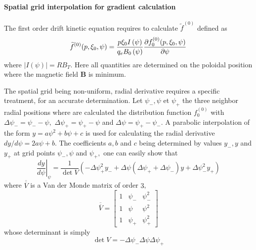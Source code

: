 
\label{dkegridinterp}\paragraph{Spatial grid interpolation for
gradient calculation}

The first order drift kinetic equation requires to calculate $\widetilde{f}%
^{(0)}$ defined as
\begin{equation}
\widetilde{f}^{(0)}(p,\xi _{0},\psi )=\frac{p\xi _{0}I\left( \psi \right) }{%
q_{e}B_{0}\left( \psi \right) }\frac{\partial f_{0}^{(0)}(p,\xi _{0},\psi )}{%
\partial \psi }
\end{equation}
where $\left| I\left( \psi \right) \right| =RB_{T}.$ Here all quantities are
determined on the poloidal position where the magnetic field  $\mathbf{B}$
is minimum.

The spatial grid being non-uniform, radial derivative requires a specific
treatment, for an accurate determination. Let $\psi _{-},\psi $ et $\psi
_{+} $ the three neighbor radial positions where are calculated the
distribution function $f_{0}^{(0)}$ with $\Delta \psi _{-}=\psi _{-}-\psi ,$
$\Delta \psi _{+}=\psi _{+}-\psi $ and $\Delta \psi =\psi _{+}-\psi _{-}.$ A
parabolic interpolation of the form $y=a\psi ^{2}+b\psi +c$ is used for
calculating the radial derivative $dy/d\psi =2a\psi +b.$ The coefficients $%
a,b$ and $c$ being determined by values $y_{-},y$ and $y_{+}$ at grid points
$\psi _{-},\psi $ and $\psi _{+},$ one can easily show that
\begin{equation}
\left. \frac{dy}{d\psi }\right| _{\psi }=\frac{1}{\det V}\left( -\Delta \psi
_{+}^{2}y_{-}+\Delta \psi \left( \Delta \psi _{+}+\Delta \psi _{-}\right)
y+\Delta \psi _{-}^{2}y_{+}\right)
\end{equation}
where $\overline{\overline{V}}$ is a Van der Monde matrix of order $3$,
\begin{equation}
\overline{\overline{V}}=\left[
\begin{array}{lll}
1 & \psi _{-} & \psi _{-}^{2} \\
1 & \psi & \psi ^{2} \\
1 & \psi _{+} & \psi _{+}^{2}
\end{array}
\right]
\end{equation}
whose determinant is simply
\begin{equation}
\det V=-\Delta \psi _{-}\Delta \psi \Delta \psi _{+}
\end{equation}

